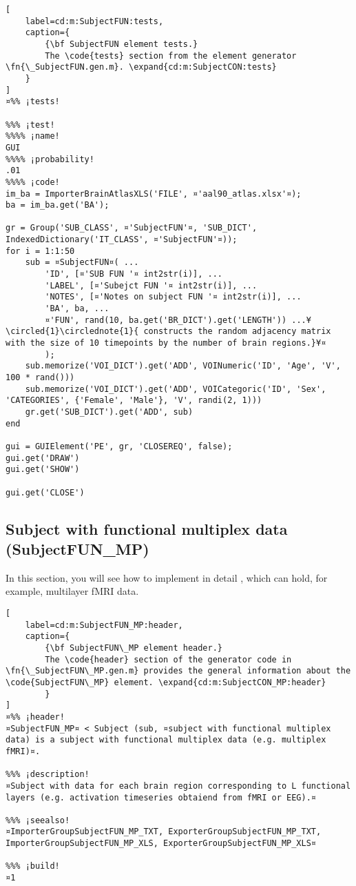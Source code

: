 \documentclass{tufte-handout}
\begin{document}
\begin{lstlisting}[
	label=cd:m:SubjectFUN:tests,
	caption={
		{\bf SubjectFUN element tests.}
		The \code{tests} section from the element generator \fn{\_SubjectFUN.gen.m}. \expand{cd:m:SubjectCON:tests}
	}
]
¤%% ¡tests!

%%% ¡test!
%%%% ¡name!
GUI
%%%% ¡probability!
.01
%%%% ¡code!
im_ba = ImporterBrainAtlasXLS('FILE', ¤'aal90_atlas.xlsx'¤);
ba = im_ba.get('BA');

gr = Group('SUB_CLASS', ¤'SubjectFUN'¤, 'SUB_DICT', IndexedDictionary('IT_CLASS', ¤'SubjectFUN'¤));
for i = 1:1:50
    sub = ¤SubjectFUN¤( ...
        'ID', [¤'SUB FUN '¤ int2str(i)], ...
        'LABEL', [¤'Subejct FUN '¤ int2str(i)], ...
        'NOTES', [¤'Notes on subject FUN '¤ int2str(i)], ...
        'BA', ba, ...
        ¤'FUN', rand(10, ba.get('BR_DICT').get('LENGTH')) ...¥\circled{1}\circlednote{1}{ constructs the random adjacency matrix with the size of 10 timepoints by the number of brain regions.}¥¤
        );
    sub.memorize('VOI_DICT').get('ADD', VOINumeric('ID', 'Age', 'V', 100 * rand()))
    sub.memorize('VOI_DICT').get('ADD', VOICategoric('ID', 'Sex', 'CATEGORIES', {'Female', 'Male'}, 'V', randi(2, 1)))
    gr.get('SUB_DICT').get('ADD', sub)
end

gui = GUIElement('PE', gr, 'CLOSEREQ', false);
gui.get('DRAW')
gui.get('SHOW')

gui.get('CLOSE')
\end{lstlisting}

\clearpage

\subsection{Subject with functional multiplex data (SubjectFUN\_MP)}

In this section, you will see how to implement in detail , which can hold, for example, multilayer fMRI data.

\begin{lstlisting}[
	label=cd:m:SubjectFUN_MP:header,
	caption={
		{\bf SubjectFUN\_MP element header.}
		The \code{header} section of the generator code in \fn{\_SubjectFUN\_MP.gen.m} provides the general information about the \code{SubjectFUN\_MP} element. \expand{cd:m:SubjectCON_MP:header}
		}
]
¤%% ¡header!
¤SubjectFUN_MP¤ < Subject (sub, ¤subject with functional multiplex data) is a subject with functional multiplex data (e.g. multiplex fMRI)¤.

%%% ¡description!
¤Subject with data for each brain region corresponding to L functional layers (e.g. activation timeseries obtaiend from fMRI or EEG).¤

%%% ¡seealso!
¤ImporterGroupSubjectFUN_MP_TXT, ExporterGroupSubjectFUN_MP_TXT, ImporterGroupSubjectFUN_MP_XLS, ExporterGroupSubjectFUN_MP_XLS¤

%%% ¡build!
¤1
\end{lstlisting}
\end{document}
